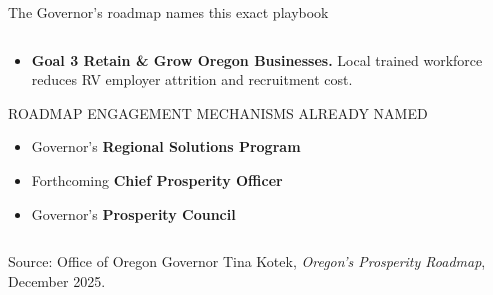 \documentclass[aspectratio=169,11pt]{beamer}
\newcommand{\eyebrow}[1]{%
  {\sffamily\fontsize{7.5pt}{9pt}\selectfont
   \color{textMuted}%
   \MakeUppercase{#1}%
  }%
}
\newcommand{\monoLabel}[1]{%
  {\ttfamily\fontsize{7.5pt}{9pt}\selectfont\color{textMuted}#1}%
}
\begin{document}
\begin{frame}{The Governor's roadmap names this exact playbook}
\begin{columns}[T,onlytextwidth]
\begin{column}{0.46\textwidth}
\begin{itemize}
              Matches the roadmap's named model: \emph{post-secondary
              + employers + state}, with the federal funding
              attached.
        \item \textbf{Goal 3 \textemdash{} Retain \& Grow Oregon
              Businesses.} Local trained workforce reduces RV
              employer attrition and recruitment cost.
      \end{itemize}
      \vspace{4pt}
      \eyebrow{Roadmap engagement mechanisms already named}
      \vspace{2pt}
      \begin{itemize}\itemsep1pt
        \item Governor's \textbf{Regional Solutions Program}
        \item Forthcoming \textbf{Chief Prosperity Officer}
        \item Governor's \textbf{Prosperity Council}
      \end{itemize}
    \end{column}
  \end{columns}
  \par\vspace{4pt}
  \monoLabel{Source: Office of Oregon Governor Tina Kotek, \emph{Oregon's Prosperity Roadmap}, December 2025.}
\end{frame}
\end{document}
